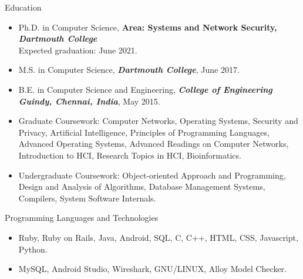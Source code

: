 \documentclass[]{mcdowellcv}
\begin{document}
	\makeheader
	
 \begin{cvsection}{Education}
		\begin{cvsubsection}
{}{}{}
			\begin{itemize}
				\item Ph.D. in Computer Science, \textbf{Area: Systems and Network Security, \textit{\color{ForestGreen}  Dartmouth College}}\\ Expected graduation: June 2021.
				\item M.S. in Computer Science, \textbf{\textit{\color{ForestGreen}  Dartmouth College}}, June 2017. 
				\item B.E. in Computer Science and Engineering, \textbf{\textit{\color{ForestGreen} College of Engineering Guindy, Chennai, India}}, May 2015.
              
				\item  Graduate Coursework: Computer Networks, Operating Systems, Security and Privacy, Artificial Intelligence, Principles of Programming Languages, Advanced Operating Systems, Advanced Readings on Computer Networks, Introduction to HCI, Research Topics in HCI, Bioinformatics.
                \item Undergraduate Coursework: Object-oriented Approach and Programming, Design and Analysis of Algorithms, Database Management Systems, Compilers, System Software Internals.
			
			
			\end{itemize}
		\end{cvsubsection}
	\end{cvsection}
    	\begin{cvsection}{Programming Languages and Technologies}
		\begin{cvsubsection}{}{}{}	
			\begin{itemize}
				\item  Ruby, Ruby on Rails, Java, Android, SQL, C, C++, HTML, CSS, Javascript, Python.
				\item  MySQL, Android Studio, Wireshark, GNU/LINUX, Alloy Model Checker.
			\end{itemize}
		\end{cvsubsection}
	\end{cvsection}	
\end{document}
